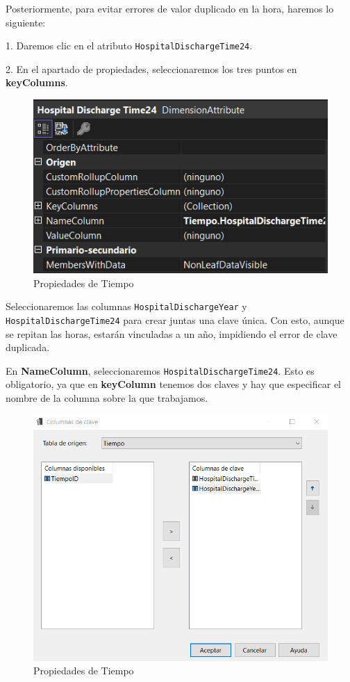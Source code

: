 \documentclass[12pt, a4paper, twoside]{article}
\begin{document}
Posteriormente, para evitar errores de valor duplicado en la hora, haremos lo siguiente:

1. Daremos clic en el atributo \texttt{HospitalDischargeTime24}.

2. En el apartado de propiedades, seleccionaremos los tres puntos en \textbf{keyColumns}.

\begin{figure}[H]
	\centering
	\includegraphics[width=1\textwidth]{image/tiempoPropiedades}
	\caption{Propiedades de Tiempo}
	\label{fig:25}
\end{figure}

Seleccionaremos las columnas \texttt{HospitalDischargeYear} y \texttt{HospitalDischargeTime24} para crear juntas una clave única. Con esto, aunque se repitan las horas, estarán vinculadas a un año, impidiendo el error de clave duplicada.

En \textbf{NameColumn}, seleccionaremos \texttt{HospitalDischargeTime24}. Esto es obligatorio, ya que en \textbf{keyColumn} tenemos dos claves y hay que especificar el nombre de la columna sobre la que trabajamos.

\begin{figure}[H]
	\centering
	\includegraphics[width=1\textwidth]{image/keyColumnTiempo}
	\caption{Propiedades de Tiempo}
	\label{fig:29}
\end{figure}
\end{document}
